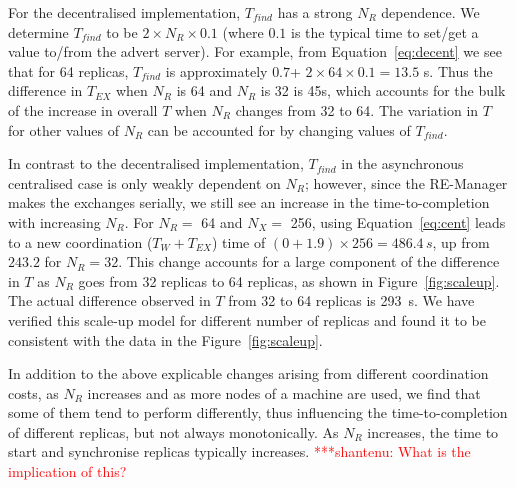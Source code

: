 \documentclass{rspublic}
\newcommand{\jhanote}[1]{ {\textcolor{red} { ***shantenu: #1 }}}
\newcommand{\alnote}[1]{ {\textcolor{blue} { ***andre: #1 }}}
\newcommand{\athotanote}[1]{ {\textcolor{green} { ***athota: #1 }}}
\newcommand{\alnote}[1]{}
\newcommand{\athotanote}[1]{}
\newcommand{\jhanote}[1]{}
\begin{document}
For the decentralised implementation, $T_{find}$ has a strong $N_R$
dependence. We determine $T_{find}$ to be $2 \times N_R \times 0.1$
(where $0.1$ is the typical time to set/get a value to/from the advert
server).  For example, from Equation~\ref{eq:decent} we see that for
64 replicas, $T_{find}$ is approximately $0.7$+ $2 \times 64 \times
0.1 = 13.5$ s.  Thus the difference in $T_{EX}$ when $N_R$ is 64
and $N_R$ is 32 is 45s, which accounts for the bulk of the increase in
overall $T$ when $N_R$ changes from 32 to
64. %
The variation in $T$ for other values of $N_R$ can be
accounted for by changing values of $T_{find}$.



In contrast to the decentralised implementation, $T_{find}$ in the
asynchronous centralised case is only weakly dependent on $N_R$; however,
since the RE-Manager makes the exchanges serially, we still see an
increase in the time-to-completion with increasing $N_R$. %
For $N_R =$ 64 and $N_X=$ 256, using Equation~\ref{eq:cent} leads to a
new coordination ($T_W + T_{EX}$) time of $(0+1.9) \times 256 =
486.4\,s$, up from $243.2$ for $N_R = 32$. This change accounts for a
large component of the difference in $T$ as $N_R$ goes from 32
replicas to 64 replicas, as shown in Figure~\ref{fig:scaleup}. The
actual difference observed in $T$ from 32 to 64 replicas is 293~s. We
have verified this scale-up model for different number of replicas and
found it to be consistent with the data in the
Figure~\ref{fig:scaleup}.

In addition to the above explicable changes arising from different
coordination costs, as $N_R$ increases and as more nodes of a machine
are used, we find that some of them tend to perform differently, thus
influencing the time-to-completion of different replicas, but not
always monotonically.  %
As $N_R$ increases, the time to start and synchronise replicas
typically increases. \jhanote{What is the implication of this?}

\end{document}
